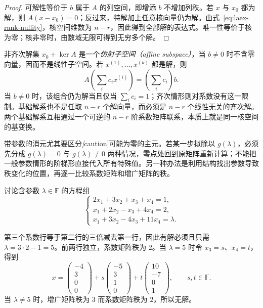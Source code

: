 \begin{proof}
可解性等价于 $b$ 属于 $A$ 的列空间，即增添 $b$ 不增加列秩。若 $x$ 与 $x_0$ 都为解，则 $A(x-x_0)=0$；反过来，特解加上任意核向量仍为解。由式~\eqref{eq:laex-rank-nullity}，核空间维数为 $n-r$，因此得到全部解的表达式。唯一性等价于核为零；核非零时，由数域无限可得到无穷多个解。
\end{proof}

非齐次解集 $x_0+\ker A$ 是一个\emph{仿射子空间（affine subspace）}，当 $b\ne0$ 时不含零向量，因而不是线性子空间。若 $x^{(1)},\ldots,x^{(k)}$ 都是解，则
\[
A\left(\sum_i c_ix^{(i)}\right)=\left(\sum_i c_i\right)b.
\]
当 $b\ne0$ 时，该组合仍为解当且仅当 $\sum_i c_i=1$；齐次情形则对系数没有这一限制。基础解系也不是任取 $n-r$ 个解向量，而必须是 $n-r$ 个线性无关的齐次解。两个基础解系互相通过一个可逆的 $n-r$ 阶系数矩阵联系，本质上就是同一核空间的基变换。

带参数的消元尤其要区分\emph[caution]{可能为零的主元}。若某一步拟除以 $g(\lambda)$，必须先分成 $g(\lambda)=0$ 与 $g(\lambda)\ne0$ 两种情况，零点处回到原矩阵重新计算；不能把一般参数情形的阶梯形直接代入所有特殊值。另一种办法是利用结构找出参数导致秩变化的位置，再逐一比较系数矩阵和增广矩阵的秩。

\begin{example}
\label{ex:laex-parameter-consistency}
讨论含参数 $\lambda\in\mathbb F$ 的方程组
\[
\begin{cases}
2x_1+3x_2+x_3+x_4=1,\\
x_1+2x_2-x_3+4x_4=2,\\
x_1+3x_2-4x_3+11x_4=\lambda.
\end{cases}
\]
\end{example}

\begin{solve}
第三个系数行等于第二行的三倍减去第一行，因此有解必须且只需 $\lambda=3\cdot2-1=5$。前两行独立，系数矩阵秩为 $2$。当 $\lambda=5$ 时令 $x_3=s$、$x_4=t$，得到
\[
x=\begin{pmatrix}-4\\3\\0\\0\end{pmatrix}
+s\begin{pmatrix}-5\\3\\1\\0\end{pmatrix}
+t\begin{pmatrix}10\\-7\\0\\1\end{pmatrix},\qquad s,t\in\mathbb F.
\]
当 $\lambda\ne5$ 时，增广矩阵秩为 $3$ 而系数矩阵秩为 $2$，所以无解。
\end{solve}

